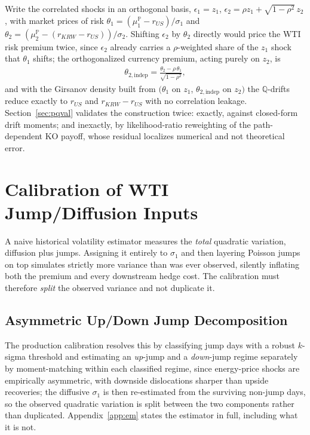 \documentclass[11pt,a4paper]{article}
\begin{document}
Write the correlated shocks in an orthogonal basis, $\epsilon_1=z_1$, $\epsilon_2=\rho z_1+\sqrt{1-\rho^2}\,z_2$, with market prices of risk $\theta_1=(\mu_1^{\mathbb P}-r_{US})/\sigma_1$ and $\theta_2=(\mu_2^{\mathbb P}-(r_{KRW}-r_{US}))/\sigma_2$. Shifting $\epsilon_2$ by $\theta_2$ directly would price the WTI risk premium twice, since $\epsilon_2$ already carries a $\rho$-weighted share of the $z_1$ shock that $\theta_1$ shifts; the orthogonalized currency premium, acting purely on $z_2$, is
\begin{align}
\theta_{2,\text{indep}} = \frac{\theta_2 - \rho\,\theta_1}{\sqrt{1-\rho^2}},
\end{align}
and with the Girsanov density built from $(\theta_1$ on $z_1$, $\theta_{2,\text{indep}}$ on $z_2)$ the $\mathbb Q$-drifts reduce exactly to $r_{US}$ and $r_{KRW}-r_{US}$ with no correlation leakage. Section~\ref{sec:pqval} validates the construction twice: exactly, against closed-form drift moments; and inexactly, by likelihood-ratio reweighting of the path-dependent KO payoff, whose residual localizes numerical and not theoretical error.

\section{Calibration of WTI Jump/Diffusion Inputs}
\label{sec:calibration}

A naive historical volatility estimator measures the \emph{total} quadratic variation, diffusion plus jumps. Assigning it entirely to $\sigma_1$ and then layering Poisson jumps on top simulates strictly more variance than was ever observed, silently inflating both the premium and every downstream hedge cost. The calibration must therefore \emph{split} the observed variance and not duplicate it.

\subsection{Asymmetric Up/Down Jump Decomposition}
\label{sec:emcalib}

The production calibration resolves this by classifying jump days with a robust $k$-sigma threshold and estimating an \emph{up}-jump and a \emph{down}-jump regime separately by moment-matching within each classified regime, since energy-price shocks are empirically asymmetric, with downside dislocations sharper than upside recoveries; the diffusive $\sigma_1$ is then re-estimated from the surviving non-jump days, so the observed quadratic variation is split between the two components rather than duplicated. Appendix~\ref{app:em} states the estimator in full, including what it is not.
\end{document}
